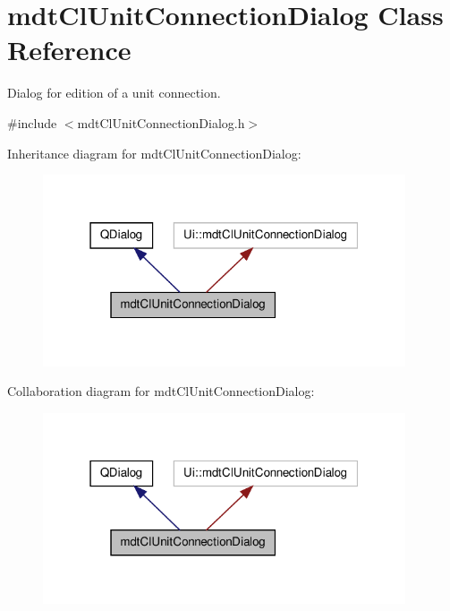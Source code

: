\hypertarget{classmdt_cl_unit_connection_dialog}{\section{mdt\-Cl\-Unit\-Connection\-Dialog Class Reference}
\label{classmdt_cl_unit_connection_dialog}
}


Dialog for edition of a unit connection.  




{\ttfamily \#include $<$mdt\-Cl\-Unit\-Connection\-Dialog.\-h$>$}



Inheritance diagram for mdt\-Cl\-Unit\-Connection\-Dialog\-:
\nopagebreak
\begin{figure}[H]
\begin{center}
\leavevmode
\includegraphics[width=304pt]{classmdt_cl_unit_connection_dialog__inherit__graph}
\end{center}
\end{figure}


Collaboration diagram for mdt\-Cl\-Unit\-Connection\-Dialog\-:
\nopagebreak
\begin{figure}[H]
\begin{center}
\leavevmode
\includegraphics[width=304pt]{classmdt_cl_unit_connection_dialog__coll__graph}
\end{center}
\end{figure}
